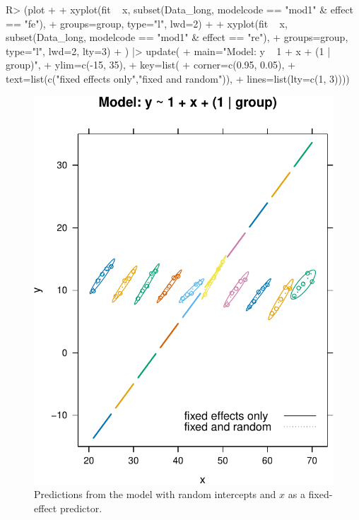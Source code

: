 \documentclass[
]{jss}
\begin{document}
\begin{CodeChunk}
\begin{CodeInput}
R> (plot +
+   xyplot(fit ~ x, subset(Data_long, modelcode == "mod1" & effect == "fe"),
+          groups=group, type="l", lwd=2) +
+   xyplot(fit ~ x, subset(Data_long, modelcode == "mod1" & effect == "re"),
+          groups=group, type="l", lwd=2, lty=3)
+ ) |> update(
+   main="Model: y ~ 1 + x + (1 | group)",
+   ylim=c(-15, 35),
+   key=list(
+     corner=c(0.95, 0.05),
+     text=list(c("fixed effects only","fixed and random")),
+     lines=list(lty=c(1, 3))))
\end{CodeInput}
\begin{figure}

{\centering \includegraphics[width=1\linewidth]{JSS-article-reduced_files/figure-latex/plot-fits-mod1-1} 

}

\caption[Predictions from the model with random intercepts and $x$ as a fixed-effect predictor]{Predictions from the model with random intercepts and $x$ as a fixed-effect predictor.}\label{fig:plot-fits-mod1}
\end{figure}
\end{CodeChunk}
\end{document}
